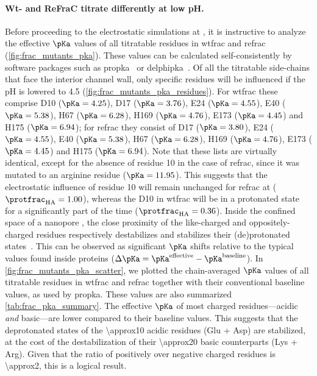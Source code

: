 \paragraph{Wt- and ReFraC titrate differently at low pH.}
%
Before proceeding to the electrostatic simulations at , it is instructive to analyze the
effective $\pKa$ values of all titratable residues in \gls{wtfrac} and \gls{refrac}
(\cref{fig:frac_mutants_pka}). These values can be calculated self-consistently by software packages such as
\gls{propka}~\cite{Olsson-2011,Sondergaard-2011} or \gls{delphipka}~\cite{Wang-2015}. Of all the titratable
side-chains that face the interior channel wall, only specific residues will be influenced if the pH is
lowered to \num{4.5} (\cref{fig:frac_mutants_pka_residues}). For \gls{wtfrac} these comprise D10 ($\pKa =
4.25$), D17 ($\pKa = 3.76$), E24 ($\pKa = 4.55$), E40 ($\pKa = 5.38$), H67 ($\pKa = 6.28$), H169 ($\pKa =
4.76$), E173 ($\pKa = 4.45$) and H175 ($\pKa = 6.94$); for \gls{refrac} they consist of D17 ($\pKa = 3.80$),
E24 ($\pKa = 4.55$), E40 ($\pKa = 5.38$), H67 ($\pKa = 6.28$), H169 ($\pKa = 4.76$), E173 ($\pKa = 4.45$) and
H175 ($\pKa = 6.94$). Note that these lists are virtually identical, except for the absence of residue 10 in
the case of \gls{refrac}, since it was mutated to an arginine residue ($\pKa = 11.95$). This suggests that the
electrostatic influence of residue 10 will remain unchanged for \gls{refrac} at 
($\protfrac_{\mathrm{HA}} = 1.00$), whereas the D10 in \gls{wtfrac} will be in a protonated state for a
significantly part of the time ($\protfrac_{\mathrm{HA}} = 0.36$). Inside the confined space of a nanopore
\lumen{}, the close proximity of the like-charged and oppositely-charged residues respectively destabilizes and
stabilizes their (de)protonated states~\cite{Olsson-2011}. This can be observed as significant $\pKa$ shifts
relative to the typical values found inside proteins ($\Delta \pKa = \pKa^{\textrm{effective}} -
\pKa^{\textrm{baseline}}$). In \cref{fig:frac_mutants_pka_scatter}, we plotted the chain-averaged $\pKa$
values of all titratable residues in \gls{wtfrac} and \gls{refrac} together with their conventional baseline
values, as used by \gls{propka}. These values are also summarized \cref{tab:frac_pka_summary}. The effective
$\pKa$ of most charged residues---acidic \emph{and} basic---are lower compared to their baseline values. This
suggests that the deprotonated states of the \num{\approx10} acidic residues (Glu + Asp) are stabilized, at
the cost of the destabilization of their \num{\approx20} basic counterparts (Lys + Arg). Given that the ratio
of positively over negative charged residues is \num{\approx2}, this is a logical result.

